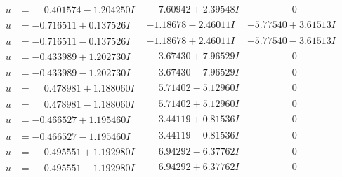 \documentclass[1p]{elsarticle_modified}
\theoremstyle{definition}
\begin{document}
$$\begin{array}{c|c|c}
\begin{aligned}
u &= \phantom{-}0.401574 - 1.204250 I\end{aligned}
 & \phantom{-}7.60942 + 2.39548 I & \phantom{-0.000000 } 0 \\ \hline\begin{aligned}
u &= -0.716511 + 0.137526 I\end{aligned}
 & -1.18678 - 2.46011 I & -5.77540 + 3.61513 I \\ \hline\begin{aligned}
u &= -0.716511 - 0.137526 I\end{aligned}
 & -1.18678 + 2.46011 I & -5.77540 - 3.61513 I \\ \hline\begin{aligned}
u &= -0.433989 + 1.202730 I\end{aligned}
 & \phantom{-}3.67430 + 7.96529 I & \phantom{-0.000000 } 0 \\ \hline\begin{aligned}
u &= -0.433989 - 1.202730 I\end{aligned}
 & \phantom{-}3.67430 - 7.96529 I & \phantom{-0.000000 } 0 \\ \hline\begin{aligned}
u &= \phantom{-}0.478981 + 1.188060 I\end{aligned}
 & \phantom{-}5.71402 - 5.12960 I & \phantom{-0.000000 } 0 \\ \hline\begin{aligned}
u &= \phantom{-}0.478981 - 1.188060 I\end{aligned}
 & \phantom{-}5.71402 + 5.12960 I & \phantom{-0.000000 } 0 \\ \hline\begin{aligned}
u &= -0.466527 + 1.195460 I\end{aligned}
 & \phantom{-}3.44119 + 0.81536 I & \phantom{-0.000000 } 0 \\ \hline\begin{aligned}
u &= -0.466527 - 1.195460 I\end{aligned}
 & \phantom{-}3.44119 - 0.81536 I & \phantom{-0.000000 } 0 \\ \hline\begin{aligned}
u &= \phantom{-}0.495551 + 1.192980 I\end{aligned}
 & \phantom{-}6.94292 - 6.37762 I & \phantom{-0.000000 } 0 \\ \hline\begin{aligned}
u &= \phantom{-}0.495551 - 1.192980 I\end{aligned}
 & \phantom{-}6.94292 + 6.37762 I & \phantom{-0.000000 } 0 \\ \hline\begin{aligned}

\end{aligned}
\end{array}$$
\end{document}
